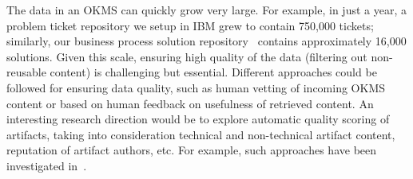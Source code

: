 
The data in an OKMS can quickly grow very large. For example, in just a year, a
problem ticket repository we setup in IBM grew to contain 750,000 tickets;
similarly, our business process solution repository~\cite{Goodwin:2012b}
contains approximately 16,000 solutions. Given this scale, ensuring high quality
of the data (\eg filtering out non-reusable content) is challenging but
essential. Different approaches could be followed for ensuring data quality,
such as human vetting of incoming OKMS content or based on human feedback on
usefulness of retrieved content. An interesting research direction would be to
explore automatic quality scoring of artifacts, taking into consideration
technical and non-technical artifact content, reputation of artifact authors,
etc. For example, such approaches have been investigated
in~\cite{Majumdar:2011}.



